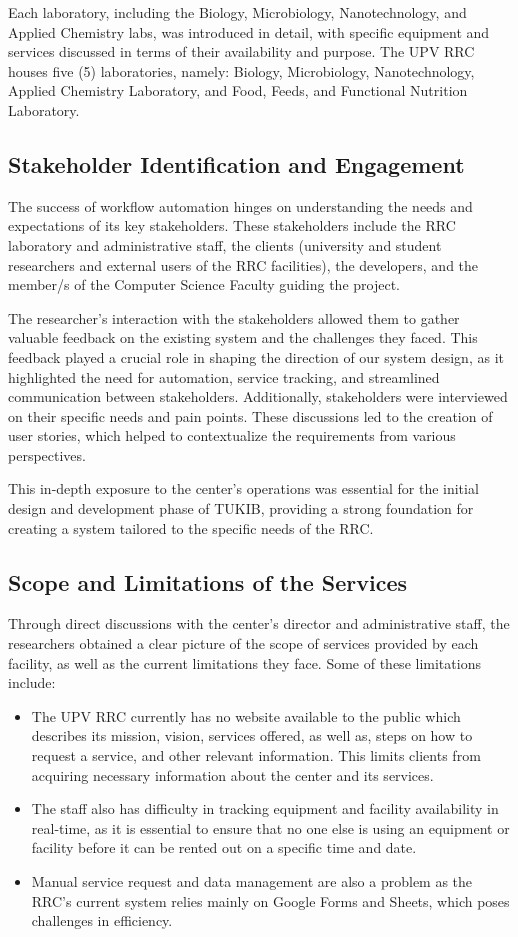 Each laboratory, including the Biology, Microbiology, Nanotechnology, and Applied Chemistry labs, was introduced in detail, with specific equipment and services discussed in terms of their availability and purpose. The UPV RRC houses five (5) laboratories, namely: Biology, Microbiology, Nanotechnology, Applied Chemistry Laboratory, and Food, Feeds, and Functional Nutrition Laboratory.

\subsection{Stakeholder Identification and Engagement}
The success of workflow automation hinges on understanding the needs and expectations of its key stakeholders. These stakeholders include the RRC laboratory and administrative staff, the clients (university and student researchers and external users of the RRC facilities), the developers, and the member/s of the Computer Science Faculty guiding the project.

The researcher's interaction with the stakeholders allowed them to gather valuable feedback on the existing system and the challenges they faced. This feedback played a crucial role in shaping the direction of our system design, as it highlighted the need for automation, service tracking, and streamlined communication between stakeholders. Additionally, stakeholders were interviewed on their specific needs and pain points. These discussions led to the creation of user stories, which helped to contextualize the requirements from various perspectives. 

This in-depth exposure to the center’s operations was essential for the initial design and development phase of TUKIB, providing a strong foundation for creating a system tailored to the specific needs of the RRC.

\subsection{Scope and Limitations of the Services}
Through direct discussions with the center’s director and administrative staff, the researchers obtained a clear picture of the scope of services provided by each facility, as well as the current limitations they face. Some of these limitations include:

\begin{itemize}
	\item The UPV RRC currently has no website available to the public which describes its mission, vision, services offered, as well as, steps on how to request a service, and other relevant information.   This limits clients from acquiring necessary information about the center and its services.
	\item The staff also has difficulty in tracking equipment and facility availability in real-time, as it is essential to ensure that no one else is using an equipment or facility before it can be rented out on a specific time and date.
	\item Manual service request and data management are also a problem as the RRC’s current system relies mainly on Google Forms and Sheets, which poses challenges in efficiency.
\end{itemize}

